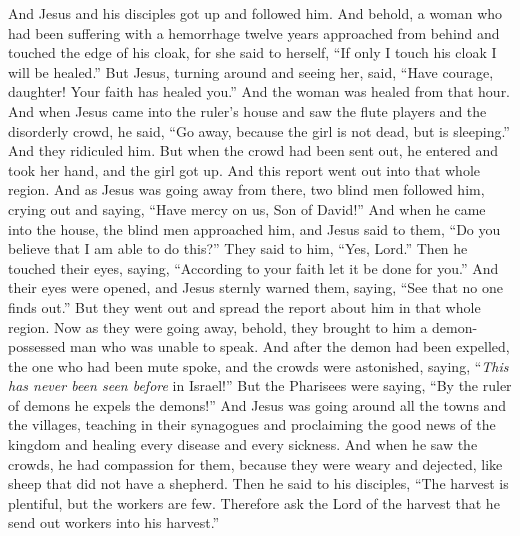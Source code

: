 \begin{biblechapter}
\verse And Jesus and his disciples got up and followed him.
\verse And behold, a woman who had been suffering with a hemorrhage twelve years approached from behind and touched the edge of his cloak,
\verse for she said to herself, “If only I touch his cloak I will be healed.”
\verse But Jesus, turning around and seeing her, said, “Have courage, daughter! Your faith has healed you.” And the woman was healed from that hour.
\verse And when Jesus came into the ruler’s house and saw the flute players and the disorderly crowd,
\verse he said, “Go away, because the girl is not dead, but is sleeping.” And they ridiculed him.
\verse But when the crowd had been sent out, he entered and took her hand, and the girl got up.
\verse And this report went out into that whole region.
 And as Jesus was going away from there, two blind men followed him, crying out and saying, “Have mercy on us, Son of David!”
\verse And when he came into the house, the blind men approached him, and Jesus said to them, “Do you believe that I am able to do this?” They said to him, “Yes, Lord.”
\verse Then he touched their eyes, saying, “According to your faith let it be done for you.”
\verse And their eyes were opened, and Jesus sternly warned them, saying, “See that no one finds out.”
\verse But they went out and spread the report about him in that whole region.
 Now as they were going away, behold, they brought to him a demon-possessed man who was unable to speak.
\verse And after the demon had been expelled, the one who had been mute spoke, and the crowds were astonished, saying, “\textit{This has never been seen before} in Israel!”
\verse But the Pharisees were saying, “By the ruler of demons he expels the demons!”
 And Jesus was going around all the towns and the villages, teaching in their synagogues and proclaiming the good news of the kingdom and healing every disease and every sickness.
\verse And when he saw the crowds, he had compassion for them, because they were weary and dejected, like sheep that did not have a shepherd.
\verse Then he said to his disciples, “The harvest is plentiful, but the workers are few.
\verse Therefore ask the Lord of the harvest that he send out workers into his harvest.”
\end{biblechapter}

